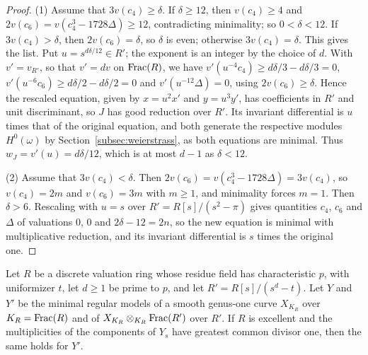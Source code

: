 \begin{proof}
(1) Assume that $3v(c_4)\geq\delta$.
If $\delta\geq 12$, then $v(c_4)\geq 4$ and $2v(c_6) = v(c_4^3-1728\Delta)\geq 12$, contradicting minimality; so $0<\delta<12$.
If $3v(c_4)>\delta$, then $2v(c_6) = \delta$, so $\delta$ is even; otherwise $3v(c_4) = \delta$.
This gives the list.
Put $u = s^{d\delta/12}\in R'$; the exponent is an integer by the choice of $d$.
With $v' = v_{R'}$, so that $v' = dv$ on $\operatorname{Frac}(R)$, we have $v'(u^{-4}c_4)\geq d\delta/3-d\delta/3 = 0$, $v'(u^{-6}c_6)\geq d\delta/2-d\delta/2 = 0$ and $v'(u^{-12}\Delta) = 0$, using $2v(c_6)\geq\delta$.
Hence the rescaled equation, given by $x = u^2x'$ and $y = u^3y'$, has coefficients in $R'$ and unit discriminant, so $J$ has good reduction over $R'$.
Its invariant differential is $u$ times that of the original equation, and both generate the respective modules $H^0(\omega)$ by Section~\ref{subsec:weierstrass}, as both equations are minimal.
Thus $w_J = v'(u) = d\delta/12$, which is at most $d-1$ as $\delta<12$.

(2) Assume that $3v(c_4)<\delta$.
Then $2v(c_6) = v(c_4^3-1728\Delta) = 3v(c_4)$, so $v(c_4) = 2m$ and $v(c_6) = 3m$ with $m\geq 1$, and minimality forces $m = 1$.
Then $\delta>6$.
Rescaling with $u = s$ over $R' = R[s]/(s^2-\pi)$ gives quantities $c_4$, $c_6$ and $\Delta$ of valuations $0$, $0$ and $2\delta-12 = 2n$, so the new equation is minimal with multiplicative reduction, and its invariant differential is $s$ times the original one.
\end{proof}

\begin{lemma}\label{lem:gcd-tame}
Let $R$ be a discrete valuation ring whose residue field has characteristic $p$, with uniformizer $t$, let $d\geq 1$ be prime to $p$, and let $R' = R[s]/(s^d-t)$.
Let $Y$ and $Y'$ be the minimal regular models of a smooth genus-one curve $X_{K_R}$ over $K_R = \operatorname{Frac}(R)$ and of $X_{K_R}\otimes_{K_R}\operatorname{Frac}(R')$ over $R'$.
If $R$ is excellent and the multiplicities of the components of $Y_s$ have greatest common divisor one, then the same holds for $Y'$.
\end{lemma}

